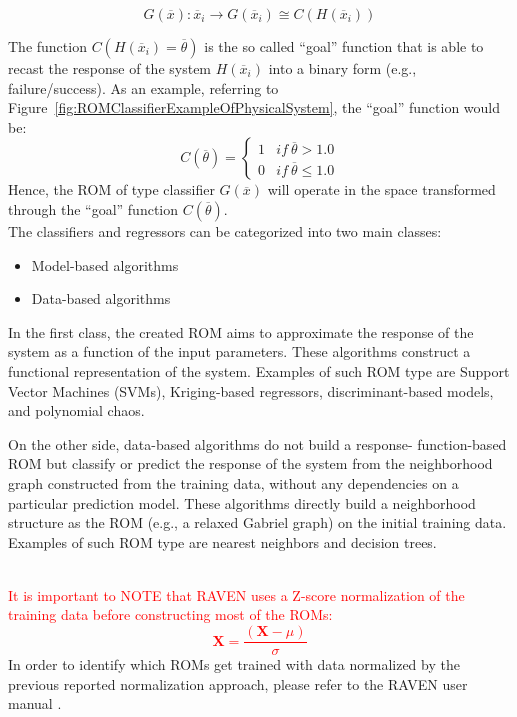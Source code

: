 \begin{equation}
\label{eq:classifier}
G\left ( \overline{x} \right ):\overline{x}_{i} \rightarrow G\left ( \overline{x}_{i} \right ) \cong
C \left ( H\left ( \overline{x}_{i} \right ) \right )
\end{equation}

The function $C\left (  H\left ( \overline{x}_{i}  \right ) = \overline{\theta}
\right ) $ is the so called ``goal'' function that is able to recast the
response of the system $H\left ( \overline{x}_{i}  \right )$ into a binary
form (e.g., failure/success). As an example, referring to
Figure~\ref{fig:ROMClassifierExampleOfPhysicalSystem}, the
``goal'' function would be:
\begin{equation}
\label{eq:goalFunctionClassifier}
C\left (   \overline{\theta}  \right ) = \left\{\begin{matrix}
1 & if \: \overline{\theta}>1.0 \\
0 &  if \: \overline{\theta} \leq 1.0
\end{matrix}\right.
\end{equation}
Hence, the ROM of type classifier $G\left (  \overline{x} \right )$  will operate in the space transformed through the ``goal''  function $C\left (   \overline{\theta}  \right )$.
\\The classifiers and regressors can be categorized into two main classes:
\begin{itemize}
  \item Model-based algorithms
  \item Data-based algorithms
\end{itemize}
In the first class, the created ROM aims to approximate the response
of the system as a function of the input parameters. These algorithms
construct a functional representation of the system. Examples of such ROM type are Support Vector Machines (SVMs), Kriging-based regressors, discriminant-based models, and polynomial chaos.

On the other side, data-based algorithms do not build a response-
function-based ROM but classify or predict the response of the
system from the neighborhood graph constructed from the training
data, without any dependencies on a particular prediction model.
These algorithms directly build a neighborhood structure as the
ROM (e.g., a relaxed Gabriel graph) on the initial training data. Examples of such ROM type are nearest neighbors and decision trees.

\textcolor{red}{\\It is important to NOTE that RAVEN uses a Z-score normalization of the training data before
  constructing most of the ROMs:
\begin{equation}
  \mathit{\mathbf{X}} = \frac{(\mathit{\mathbf{X}}-\mu )}{\sigma }
\end{equation}
 }
In order to identify which ROMs get trained with data normalized by the previous reported normalization approach, please refer to the RAVEN user manual \cite{RAVENuserManual}.

